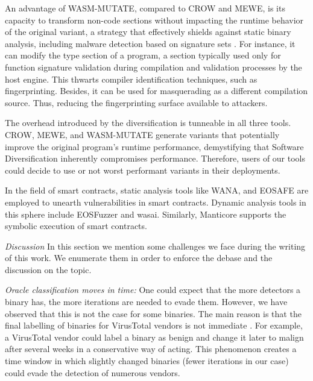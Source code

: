 An advantage of WASM-MUTATE, compared to CROW and MEWE, is its capacity to transform non-code sections without impacting the runtime behavior of the original variant, a strategy that effectively shields against static binary analysis, including malware detection based on signature sets \cite{EVASION}.
For instance, it can modify the type section of a \Wasm program, a section typically used only for function signature validation during compilation and validation processes by the host engine. 
This thwarts compiler identification techniques, such as fingerprinting.
Besides, it can be used for masquerading as a different compilation source.
Thus, reducing the fingerprinting surface available to attackers.


The overhead introduced by the diversification is tunneable in all three tools.
CROW, MEWE, and WASM-MUTATE generate variants that potentially improve the original program's runtime performance, demystifying that Software Diversification inherently compromises performance.
Therefore, users of our tools could decide to use or not worst performant variants in their deployments.


 In the field of smart contracts, static analysis tools like WANA\cite{wana}, and EOSAFE\cite{eosafe} are employed to unearth vulnerabilities in \Wasm smart contracts. 
Dynamic analysis tools in this sphere include EOSFuzzer\cite{EOSFuzzer} and wasai\cite{wasai}.
Similarly, Manticore supports the symbolic execution of \wasm smart contracts. 


\emph{Discussion}
In this section we mention some challenges we face during the writing of this work.
We enumerate them in order to enforce the debase and the discussion on the topic.

\emph{Oracle classification moves in time:}
One could expect that the more detectors a binary has, the more iterations are needed to evade them.
However, we have observed that this is not the case for some binaries.
The main reason is that the final labelling of binaries for VirusTotal vendors is not immediate \cite{251586}. 
For example, a VirusTotal vendor could label a binary as benign and change it later to malign after several weeks in a conservative way of acting.
This phenomenon creates a time window in which slightly changed binaries (fewer iterations in our case) could evade the detection of numerous vendors.

